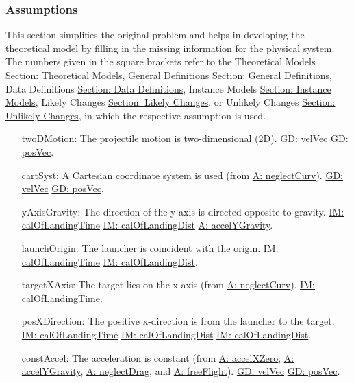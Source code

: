 \documentclass[12pt]{article}
\begin{document}
\subsubsection{Assumptions}
\label{Sec:Assumps}
This section simplifies the original problem and helps in developing the theoretical model by filling in the missing information for the physical system. The numbers given in the square brackets refer to the Theoretical Models \hyperref[Sec:TMs]{Section: Theoretical Models}, General Definitions \hyperref[Sec:GDs]{Section: General Definitions}, Data Definitions \hyperref[Sec:DDs]{Section: Data Definitions}, Instance Models \hyperref[Sec:IMs]{Section: Instance Models}, Likely Changes \hyperref[Sec:LCs]{Section: Likely Changes}, or Unlikely Changes \hyperref[Sec:UCs]{Section: Unlikely Changes}, in which the respective assumption is used.
\begin{itemize}
\item[twoDMotion:\phantomsection\label{twoDMotion}]The projectile motion is two-dimensional (2D). \hyperref[GD:velVec]{GD: velVec} \hyperref[GD:posVec]{GD: posVec}.
\item[cartSyst:\phantomsection\label{cartSyst}]A Cartesian coordinate system is used (from \hyperref[neglectCurv]{A: neglectCurv}). \hyperref[GD:velVec]{GD: velVec} \hyperref[GD:posVec]{GD: posVec}.
\item[yAxisGravity:\phantomsection\label{yAxisGravity}]The direction of the y-axis is directed opposite to gravity. \hyperref[IM:calOfLandingTime]{IM: calOfLandingTime} \hyperref[IM:calOfLandingDist]{IM: calOfLandingDist} \hyperref[accelYGravity]{A: accelYGravity}.
\item[launchOrigin:\phantomsection\label{launchOrigin}]The launcher is coincident with the origin. \hyperref[IM:calOfLandingTime]{IM: calOfLandingTime} \hyperref[IM:calOfLandingDist]{IM: calOfLandingDist}.
\item[targetXAxis:\phantomsection\label{targetXAxis}]The target lies on the x-axis (from \hyperref[neglectCurv]{A: neglectCurv}). \hyperref[IM:calOfLandingTime]{IM: calOfLandingTime}.
\item[posXDirection:\phantomsection\label{posXDirection}]The positive x-direction is from the launcher to the target. \hyperref[IM:calOfLandingTime]{IM: calOfLandingTime} \hyperref[IM:calOfLandingDist]{IM: calOfLandingDist} \hyperref[IM:calOfLandingDist]{IM: calOfLandingDist}.
\item[constAccel:\phantomsection\label{constAccel}]The acceleration is constant (from \hyperref[accelXZero]{A: accelXZero}, \hyperref[accelYGravity]{A: accelYGravity}, \hyperref[neglectDrag]{A: neglectDrag}, and \hyperref[freeFlight]{A: freeFlight}). \hyperref[GD:velVec]{GD: velVec} \hyperref[GD:posVec]{GD: posVec}.

\end{itemize}
\end{document}
